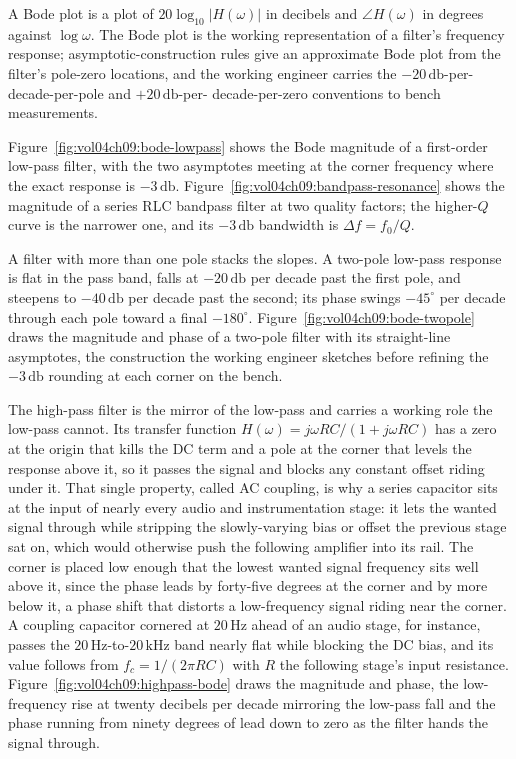 A Bode plot is a plot of $20\log_{10}|H(\omega)|$ in decibels and
$\angle H(\omega)$ in degrees against $\log\omega$. The Bode plot is
the working representation of a filter's frequency response;
asymptotic-construction rules give an approximate Bode plot from the
filter's pole-zero locations, and the working engineer carries the
$-20\,\si{\decibel}$-per-decade-per-pole and $+20\,\si{\decibel}$-per-
decade-per-zero conventions to bench measurements.



Figure~\ref{fig:vol04ch09:bode-lowpass} shows the Bode magnitude of a
first-order low-pass filter, with the two asymptotes meeting at the
corner frequency where the exact response is $-3\,\si{\decibel}$.
Figure~\ref{fig:vol04ch09:bandpass-resonance} shows the magnitude of a
series RLC bandpass filter at two quality factors; the higher-$Q$ curve
is the narrower one, and its $-3\,\si{\decibel}$ bandwidth is
$\Delta f = f_0/Q$.



A filter with more than one pole stacks the slopes. A two-pole low-pass
response is flat in the pass band, falls at $-20\,\si{\decibel}$ per
decade past the first pole, and steepens to $-40\,\si{\decibel}$ per
decade past the second; its phase swings $-45^\circ$ per decade through
each pole toward a final $-180^\circ$.
Figure~\ref{fig:vol04ch09:bode-twopole} draws the magnitude and phase of
a two-pole filter with its straight-line asymptotes, the construction
the working engineer sketches before refining the $-3\,\si{\decibel}$
rounding at each corner on the bench.



The high-pass filter is the mirror of the low-pass and carries a working role
the low-pass cannot. Its transfer function $H(\omega) = j\omega RC/(1 + j\omega
RC)$ has a zero at the origin that kills the DC term and a pole at the corner
that levels the response above it, so it passes the signal and blocks any
constant offset riding under it. That single property, called AC coupling, is
why a series capacitor sits at the input of nearly every audio and
instrumentation stage: it lets the wanted signal through while stripping the
slowly-varying bias or offset the previous stage sat on, which would otherwise
push the following amplifier into its rail. The corner is placed low enough that
the lowest wanted signal frequency sits well above it, since the phase leads by
forty-five degrees at the corner and by more below it, a phase shift that
distorts a low-frequency signal riding near the corner. A coupling capacitor
cornered at $20\,\si{\hertz}$ ahead of an audio stage, for instance, passes the
$20\,\si{\hertz}$-to-$20\,\si{\kilo\hertz}$ band nearly flat while blocking the
DC bias, and its value follows from $f_c = 1/(2\pi RC)$ with $R$ the following
stage's input resistance. Figure~\ref{fig:vol04ch09:highpass-bode} draws the
magnitude and phase, the low-frequency rise at twenty decibels per decade
mirroring the low-pass fall and the phase running from ninety degrees of lead
down to zero as the filter hands the signal through.

